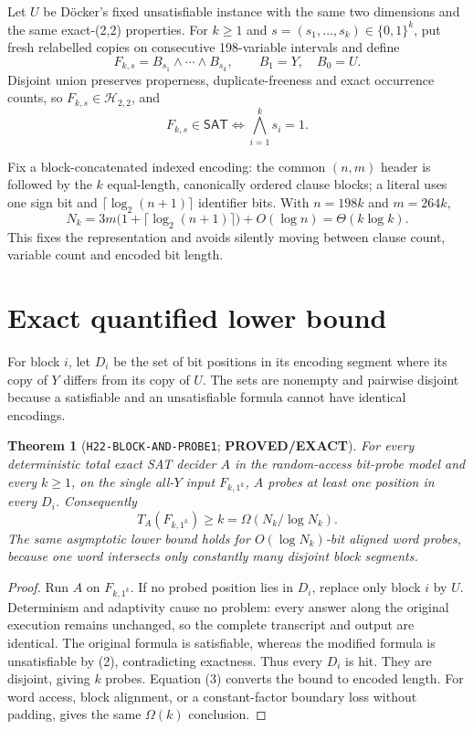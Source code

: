\documentclass[11pt]{article}
\newtheorem{theorem}{Theorem}
\newcommand{\EXACT}{\textbf{PROVED/EXACT}}
\newcommand{\Htwo}{\mathcal H_{2,2}}
\begin{document}
Let $U$ be D\"ocker's fixed unsatisfiable instance with the same two dimensions
and the same exact-(2,2) properties.  For $k\ge1$ and
$s=(s_1,\ldots,s_k)\in\{0,1\}^k$, put fresh relabelled copies on consecutive
198-variable intervals and define
\[
 F_{k,s}=B_{s_1}\wedge\cdots\wedge B_{s_k},
 \qquad B_1=Y,\quad B_0=U.
\tag{1}
\]
Disjoint union preserves properness, duplicate-freeness and exact occurrence
counts, so $F_{k,s}\in\Htwo$, and
\[
 F_{k,s}\in\mathsf{SAT}\iff \bigwedge_{i=1}^k s_i=1.
\tag{2}
\]

Fix a block-concatenated indexed encoding: the common $(n,m)$ header is followed
by the $k$ equal-length, canonically ordered clause blocks; a literal uses one
sign bit and $\lceil\log_2(n+1)\rceil$ identifier bits.  With $n=198k$ and
$m=264k$,
\[
 N_k=3m\bigl(1+\lceil\log_2(n+1)\rceil\bigr)+O(\log n)
     =\Theta(k\log k).
\tag{3}
\]
This fixes the representation and avoids silently moving between clause count,
variable count and encoded bit length.

\section{Exact quantified lower bound}

For block $i$, let $D_i$ be the set of bit positions in its encoding segment
where its copy of $Y$ differs from its copy of $U$.  The sets are nonempty and
pairwise disjoint because a satisfiable and an unsatisfiable formula cannot
have identical encodings.

\begin{theorem}[\texttt{H22-BLOCK-AND-PROBE1}; \EXACT]
For every deterministic total exact SAT decider $A$ in the random-access
bit-probe model and every $k\ge1$, on the single all-$Y$ input
$F_{k,1^k}$, $A$ probes at least one position in every $D_i$.  Consequently
\[
 T_A(F_{k,1^k})\ge k=\Omega(N_k/\log N_k).
\tag{4}
\]
The same asymptotic lower bound holds for $O(\log N_k)$-bit aligned word probes,
because one word intersects only constantly many disjoint block segments.
\end{theorem}

\begin{proof}
Run $A$ on $F_{k,1^k}$.  If no probed position lies in $D_i$, replace only
block $i$ by $U$.  Determinism and adaptivity cause no problem: every answer
along the original execution remains unchanged, so the complete transcript and
output are identical.  The original formula is satisfiable, whereas the
modified formula is unsatisfiable by (2), contradicting exactness.  Thus every
$D_i$ is hit.  They are disjoint, giving $k$ probes.  Equation (3) converts the
bound to encoded length.  For word access, block alignment, or a constant-factor
boundary loss without padding, gives the same $\Omega(k)$ conclusion.
\end{proof}
\end{document}
